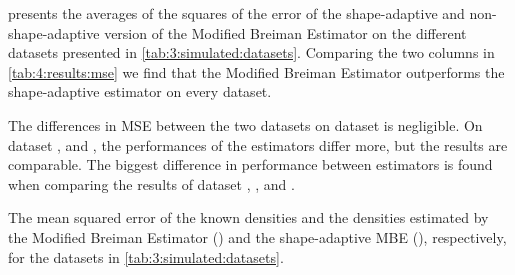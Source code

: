 
 presents the averages of the squares of the error of the shape-adaptive and non-shape-adaptive version of the Modified Breiman Estimator on the different datasets presented in \cref{tab:3:simulated:datasets}. Comparing the two columns in \cref{tab:4:results:mse} we find that the Modified Breiman Estimator outperforms the shape-adaptive estimator on every dataset. 

The differences in MSE between the two datasets on dataset \ferdosiOne is negligible. On dataset \ferdosiTwo, and \ferdosiFive, the performances of the estimators differ more, but the results are comparable. The biggest difference in performance between estimators is found when comparing the results of dataset \baakmanOne, \baakmanFour, and \baakmanFive.

\begin{table}
	\centering
	
	\caption{The mean squared error of the known densities and the densities estimated by the Modified Breiman Estimator (\mbe) and the shape-adaptive MBE (\sambe), respectively, for the datasets in \cref{tab:3:simulated:datasets}.} 	
	\label{tab:4:results:mse}
\end{table}